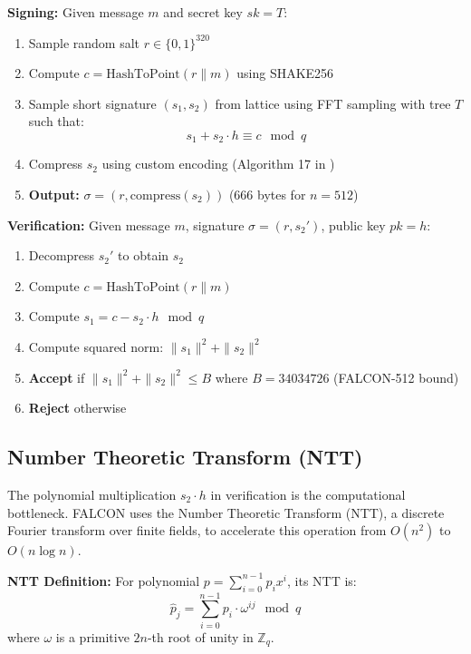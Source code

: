 \documentclass[11pt,a4paper]{article}
\begin{document}
\textbf{Signing:} Given message $m$ and secret key $sk = T$:
\begin{enumerate}
    \item Sample random salt $r \in \{0,1\}^{320}$
    \item Compute $c = \text{HashToPoint}(r \| m)$ using SHAKE256
    \item Sample short signature $(s_1, s_2)$ from lattice using FFT sampling with tree $T$ such that:
    \begin{equation}
    s_1 + s_2 \cdot h \equiv c \mod q
    \end{equation}
    \item Compress $s_2$ using custom encoding (Algorithm 17 in \cite{falcon2020})
    \item \textbf{Output:} $\sigma = (r, \text{compress}(s_2))$ (666 bytes for $n=512$)
\end{enumerate}

\textbf{Verification:} Given message $m$, signature $\sigma = (r, s_2')$, public key $pk = h$:
\begin{enumerate}
    \item Decompress $s_2'$ to obtain $s_2$
    \item Compute $c = \text{HashToPoint}(r \| m)$
    \item Compute $s_1 = c - s_2 \cdot h \mod q$
    \item Compute squared norm: $\|s_1\|^2 + \|s_2\|^2$
    \item \textbf{Accept} if $\|s_1\|^2 + \|s_2\|^2 \leq B$ where $B = 34034726$ (FALCON-512 bound)
    \item \textbf{Reject} otherwise
\end{enumerate}

\subsection{Number Theoretic Transform (NTT)}

The polynomial multiplication $s_2 \cdot h$ in verification is the computational bottleneck. FALCON uses the Number Theoretic Transform (NTT), a discrete Fourier transform over finite fields, to accelerate this operation from $O(n^2)$ to $O(n \log n)$.

\textbf{NTT Definition:} For polynomial $p = \sum_{i=0}^{n-1} p_i x^i$, its NTT is:
\begin{equation}
\hat{p}_j = \sum_{i=0}^{n-1} p_i \cdot \omega^{ij} \mod q
\end{equation}
where $\omega$ is a primitive $2n$-th root of unity in $\mathbb{Z}_q$.
\end{document}
